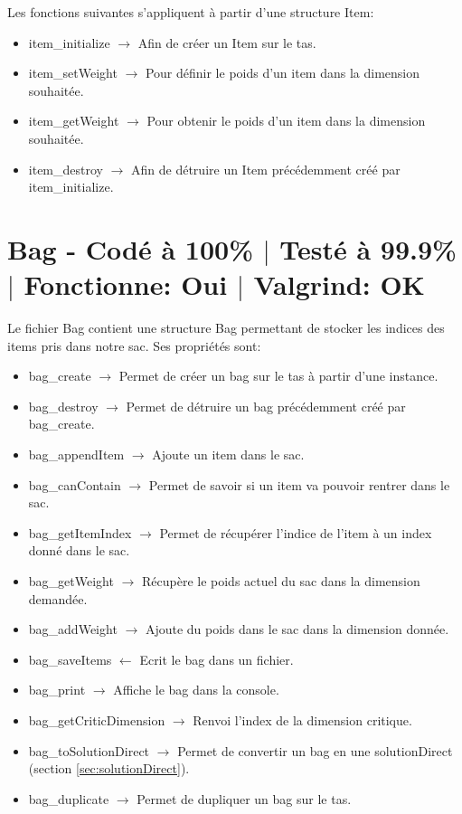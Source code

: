 \documentclass{EPUProjetPeiP}
\newcommand{\comp}[5]{
	\section[#1]{#1 {\small - Codé à #2\% $\vert$ Testé à #3\% $\vert$ Fonctionne: #4 $\vert$ Valgrind: #5}}
}
\begin{document}
Les fonctions suivantes s'appliquent à partir d'une structure Item:
\begin{itemize}
	\item item\_initialize $\longrightarrow$ Afin de créer un Item sur le tas.
	\item item\_setWeight $\longrightarrow$ Pour définir le poids d'un item dans la dimension souhaitée.
	\item item\_getWeight $\longrightarrow$ Pour obtenir le poids d'un item dans la dimension souhaitée.
	\item item\_destroy $\longrightarrow$ Afin de détruire un Item précédemment créé par item\_initialize.
\end{itemize}

\comp{Bag}{100}{99.9}{Oui}{OK}
Le fichier Bag contient une structure Bag permettant de stocker les indices des items pris dans notre sac. Ses propriétés sont:
\begin{itemize}
	\item bag\_create $\longrightarrow$ Permet de créer un bag sur le tas à partir d'une instance.
	\item bag\_destroy $\longrightarrow$ Permet de détruire un bag précédemment créé par bag\_create.
	\item bag\_appendItem $\longrightarrow$ Ajoute un item dans le sac.
	\item bag\_canContain $\longrightarrow$ Permet de savoir si un item va pouvoir rentrer dans le sac.
	\item bag\_getItemIndex $\longrightarrow$ Permet de récupérer l'indice de l'item à un index donné dans le sac.
	\item bag\_getWeight $\longrightarrow$ Récupère le poids actuel du sac dans la dimension demandée.
	\item bag\_addWeight $\longrightarrow$ Ajoute du poids dans le sac dans la dimension donnée.
	\item bag\_saveItems $\longleftarrow$ Ecrit le bag dans  un fichier.
	\item bag\_print $\longrightarrow$ Affiche le bag dans la console.
	\item bag\_getCriticDimension $\longrightarrow$ Renvoi l'index de la dimension critique.
	\item bag\_toSolutionDirect $\longrightarrow$ Permet de convertir un bag en une solutionDirect (section \ref{sec:solutionDirect}).
	\item bag\_duplicate $\longrightarrow$ Permet de dupliquer un bag sur le tas.
\end{itemize}
\end{document}
